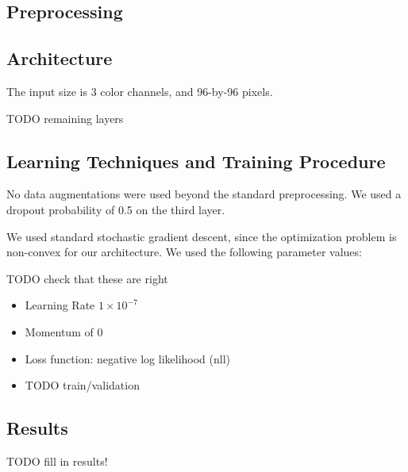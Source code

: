 \documentclass{article}
\begin{document}
\subsection*{Preprocessing}

\subsection*{Architecture}

The input size is 3 color channels, and 96-by-96 pixels. 

TODO remaining layers

\subsection*{Learning Techniques and Training Procedure}
No data augmentations were used beyond the standard preprocessing. We used a dropout probability of 0.5 on the third layer.

We used standard stochastic gradient descent, since the optimization problem is
non-convex for our architecture. We used the following parameter values:

TODO check that these are right

\begin{itemize}
\item Learning Rate $1 \times 10^{-7}$
\item Momentum of $0$
\item Loss function: negative log likelihood (nll)
\item TODO train/validation
\end{itemize}

\subsection*{Results}

TODO fill in results!
\end{document}

